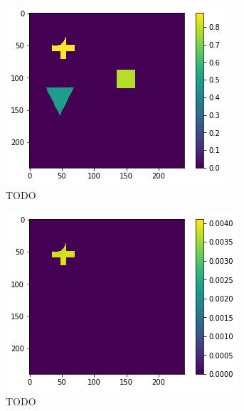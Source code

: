 \begin{figure}[H]
    \centering
    \begin{subfigure}[t]{.33\textwidth}
        \centering
        \includegraphics[width=\linewidth]{chapters/06_hdm/images_analyze/3a_masked.png}
        \caption{TODO}
    \end{subfigure}%
    \begin{subfigure}[t]{.33\textwidth}
        \centering
        \includegraphics[width=\linewidth]{chapters/06_hdm/images_analyze/3b_segment.png}
        \caption{TODO}
    \end{subfigure}
    \begin{subfigure}[t]{.33\textwidth}

\end{subfigure}
\end{figure}
